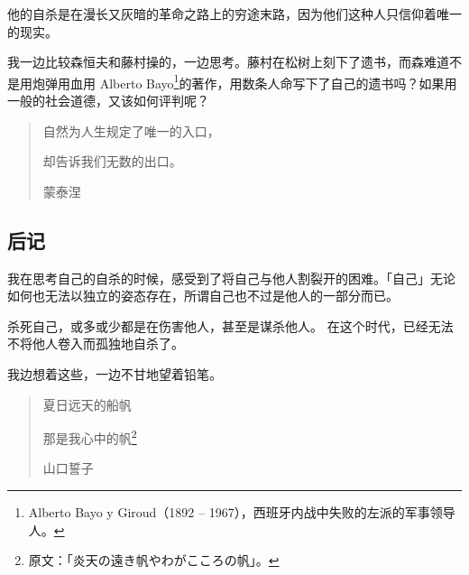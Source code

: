 \documentclass[UTF8]{ctexart}
\begin{document}
他的自杀是在漫长又灰暗的革命之路上的穷途末路，因为他们这种人只信仰着唯一的现实。

我一边比较森恒夫和藤村操的，一边思考。藤村在松树上刻下了遗书，而森难道不是用炮弹用血用 Alberto Bayo\footnote{Alberto Bayo y Giroud（1892 – 1967），西班牙内战中失败的左派的军事领导人。}的著作，用数条人命写下了自己的遗书吗？如果用一般的社会道德，又该如何评判呢？


\begin{verse}
自然为人生规定了唯一的入口，

却告诉我们无数的出口。

蒙泰涅
\end{verse}

\subsection{后记}

我在思考自己的自杀的时候，感受到了将自己与他人割裂开的困难。「自己」无论如何也无法以独立的姿态存在，所谓自己也不过是他人的一部分而已。

杀死自己，或多或少都是在伤害他人，甚至是谋杀他人。
在这个时代，已经无法不将他人卷入而孤独地自杀了。

我边想着这些，一边不甘地望着铅笔。

\begin{verse}
夏日远天的船帆

那是我心中的帆\footnote{原文：「炎天の遠き帆やわがこころの帆」。}

山口誓子
\end{verse}
\end{document}
